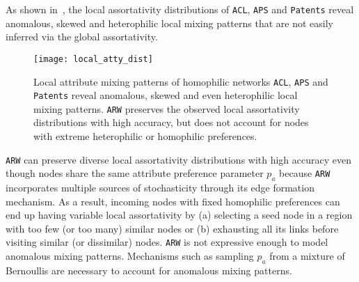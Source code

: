 As shown in~, the local assortativity distributions
of \texttt{ACL}, \texttt{APS} and \texttt{Patents} reveal anomalous, skewed
and heterophilic local mixing patterns that are not easily inferred via the global assortativity.

\begin{figure}[h]
	\centering
	\vspace{-9pt}
	\texttt{[image: local\_atty\_dist]}
	\caption{Local attribute mixing patterns of homophilic networks \texttt{ACL}, \texttt{APS}
		and \texttt{Patents} reveal anomalous, skewed and even heterophilic local mixing patterns.
		\texttt{ARW} preserves the observed local assortativity distributions with high accuracy,
	but does not account for nodes with extreme heterophilic or homophilic preferences.}
	\label{fig:local_atty}
	\vspace{-8pt}
\end{figure}

\texttt{ARW} can preserve
diverse local assortativity distributions with high accuracy even though nodes
share the same attribute preference parameter $p_a$ because  \texttt{ARW}
incorporates multiple sources of stochasticity through its edge formation
mechanism. As a result, incoming nodes with fixed homophilic preferences can end
up having variable local assortativity by (a) selecting a seed node in a region
with too few (or too many) similar nodes or (b) exhausting all its links before
visiting similar (or dissimilar) nodes.
\texttt{ARW} is not expressive enough to model anomalous
mixing patterns. Mechanisms such as sampling $p_a$ from a mixture of
Bernoullis are necessary to account for anomalous mixing patterns.
